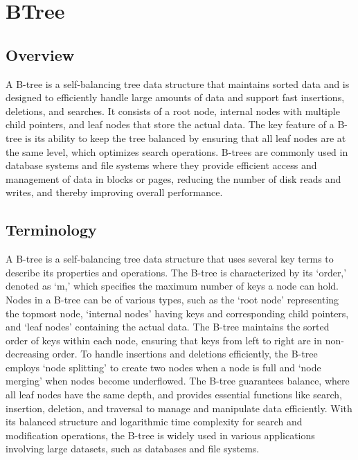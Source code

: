 \section*{BTree}

\subsection*{Overview}

A B-tree is a self-balancing tree data structure that maintains sorted data and is designed to efficiently handle large amounts of data and support fast insertions, deletions, and searches. It consists 
of a root node, internal nodes with multiple child pointers, and leaf nodes that store the actual data. The key feature of a B-tree is its ability to keep the tree balanced by ensuring that all leaf 
nodes are at the same level, which optimizes search operations. B-trees are commonly used in database systems and file systems where they provide efficient access and management of data in blocks or 
pages, reducing the number of disk reads and writes, and thereby improving overall performance.

\subsection*{Terminology}

A B-tree is a self-balancing tree data structure that uses several key terms to describe its properties and operations. The B-tree is characterized by its `order,' denoted as `m,' which specifies the 
maximum number of keys a node can hold. Nodes in a B-tree can be of various types, such as the `root node' representing the topmost node, `internal nodes' having keys and corresponding child pointers, 
and `leaf nodes' containing the actual data. The B-tree maintains the sorted order of keys within each node, ensuring that keys from left to right are in non-decreasing order. To handle insertions and 
deletions efficiently, the B-tree employs `node splitting' to create two nodes when a node is full and `node merging' when nodes become underflowed. The B-tree guarantees balance, where all leaf nodes 
have the same depth, and provides essential functions like search, insertion, deletion, and traversal to manage and manipulate data efficiently. With its balanced structure and logarithmic time 
complexity for search and modification operations, the B-tree is widely used in various applications involving large datasets, such as databases and file systems.

